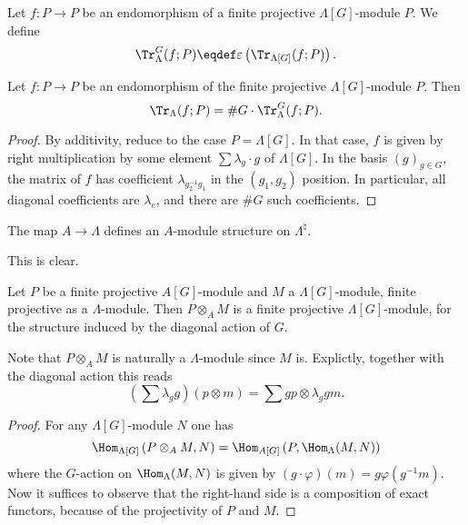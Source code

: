 \begin{defi} 
Let $f: P\to P$ be an endomorphism of a finite projective $\Lambda[G]$-module $P$. We define
$$
\Tr_{\Lambda}^G(f; P) \eqdef \varepsilon\left(\Tr_{\Lambda[G]}(f; P)\right).
$$
\end{defi}

\begin{lem} \label{lem:|ambdaTrace} 
Let $f: P\to P$ be an endomorphism of the finite projective $\Lambda[G]$-module $P$. Then
$$
\Tr_{\Lambda}(f; P) = \# G \cdot \Tr_\Lambda^G(f; P).
$$
\end{lem}

\begin{proof}
By additivity, reduce to the case $P=\Lambda[G]$. In that case, $f$ is given by right multiplication by some element $\sum\lambda_g\cdot g$ of $\Lambda[G]$. In the basis $(g)_{g \in G}$, the matrix of $f$ has coefficient $\lambda_{g_2^{-1}g_1}$ in the $(g_1, g_2)$ position. In particular, all diagonal coefficients are $\lambda_e$, and there are $\#G$ such coefficients.
\end{proof}

\begin{lem} 
The map $A\to \Lambda$ defines an $A$-module structure on $\Lambda^\natural$. 
\end{lem}

This is clear.

\begin{lem} \label{lem:DiagonalActionProjectiveModule}
Let $P$ be a finite projective $A[G]$-module and $M$ a $\Lambda[G]$-module, finite projective as a $\Lambda$-module. Then $P\otimes_A M$ is a finite projective $\Lambda[G]$-module, for the structure induced by the diagonal action of $G$.
\end{lem}

Note that $P\otimes_A M$ is naturally a $\Lambda$-module since $M$ is. Explictly, together with the diagonal action this reads
$$
\left(\sum\lambda_g g\right)\left(p\otimes m\right) = \sum g p\otimes \lambda_g g m.
$$

\begin{proof}
For any $\Lambda[G]$-module $N$ one has 
$$
\Hom_{\Lambda[G]}\left(P\otimes_A M, N\right)= \Hom_{A[G]}\left(P, \Hom_{\Lambda}(M, N)\right)
$$
where the $G$-action on $\Hom_{\Lambda}(M, N)$ is given by $(g\cdot \varphi)(m) = g \varphi (g^{-1} m) $. Now it suffices to observe that the right-hand side is a composition of exact functors, because of the projectivity of $P$ and $M$.
\end{proof}

